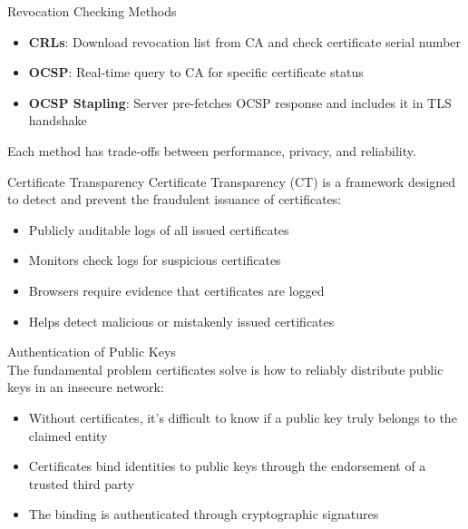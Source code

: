\begin{concept}{Revocation Checking Methods}
\begin{itemize}
    \item \textbf{CRLs}: Download revocation list from CA and check certificate serial number
    \item \textbf{OCSP}: Real-time query to CA for specific certificate status
    \item \textbf{OCSP Stapling}: Server pre-fetches OCSP response and includes it in TLS handshake
\end{itemize}
Each method has trade-offs between performance, privacy, and reliability.
\end{concept}





\begin{definition}{Certificate Transparency}
Certificate Transparency (CT) is a framework designed to detect and prevent the fraudulent issuance of certificates:
\begin{itemize}
    \item Publicly auditable logs of all issued certificates
    \item Monitors check logs for suspicious certificates
    \item Browsers require evidence that certificates are logged
    \item Helps detect malicious or mistakenly issued certificates
\end{itemize}
\end{definition}

\multend


\begin{concept}{Authentication of Public Keys}\\
The fundamental problem certificates solve is how to reliably distribute public keys in an insecure network:
\begin{itemize}
    \item Without certificates, it's difficult to know if a public key truly belongs to the claimed entity
    \item Certificates bind identities to public keys through the endorsement of a trusted third party
    \item The binding is authenticated through cryptographic signatures
\end{itemize}
\end{concept}



